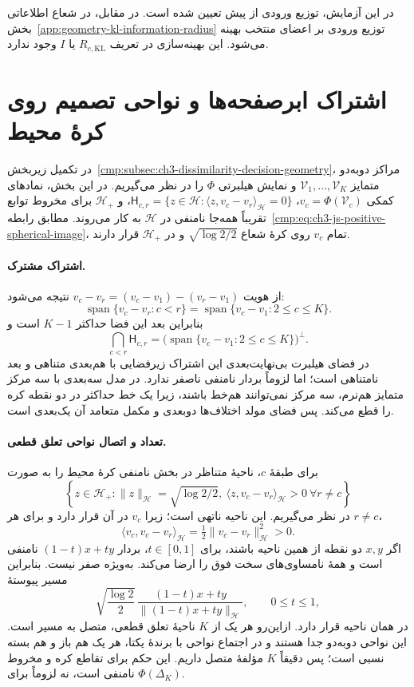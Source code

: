 در این آزمایش، توزیع ورودی از پیش تعیین شده
است. در مقابل، در شعاع اطلاعاتی
بخش~\ref{app:geometry-kl-information-radius}
توزیع ورودی بر اعضای منتخب بهینه می‌شود.
این بهینه‌سازی در تعریف $R_{c,\mathrm{KL}}$
یا $I$ وجود ندارد.

\section{اشتراک ابرصفحه‌ها و نواحی تصمیم روی کرهٔ محیط}
\label{app:geometry-js-spherical-decision}
در تکمیل زیربخش~\ref{cmp:subsec:ch3-dissimilarity-decision-geometry}،
مراکز دوبه‌دو متمایز $\mathcal V_1,\ldots,\mathcal V_K$
و نمایش هیلبرتی $\Phi$ را در نظر می‌گیریم.
در این بخش، نمادهای کمکی $v_c=\Phi(\mathcal V_c)$،
$\mathsf H_{c,r}=\{z\in\mathcal H:
\langle z,v_c-v_r\rangle_{\mathcal H}=0\}$،
و $\mathcal H_+$ برای مخروط توابع تقریباً همه‌جا
نامنفی در $\mathcal H$ به کار می‌روند. مطابق
رابطه~\eqref{cmp:eq:ch3-js-positive-spherical-image}،
تمام $v_c$ روی کرهٔ شعاع $\sqrt{\log2/2}$ و در
$\mathcal H_+$ قرار دارند.

\paragraph{اشتراک مشترک.}
از هویت $v_c-v_r=(v_c-v_1)-(v_r-v_1)$
نتیجه می‌شود:
\[
\operatorname{span}\{v_c-v_r:c<r\}
=\operatorname{span}\{v_c-v_1:2\le c\le K\}.
\]
بنابراین بعد این فضا حداکثر $K-1$ است و
\begin{equation}\label{eq:app-ch3-js-hyperplane-intersection}
\bigcap_{c<r}\mathsf H_{c,r}
=\bigl(\operatorname{span}\{v_c-v_1:2\le c\le K\}\bigr)^\perp.
\end{equation}
در فضای هیلبرت بی‌نهایت‌بعدی این اشتراک
زیرفضایی با هم‌بعدی متناهی و بعد نامتناهی
است؛ اما لزوماً بردار نامنفی ناصفر ندارد.
در مدل سه‌بعدی با سه مرکز متمایز هم‌نرم،
سه مرکز نمی‌توانند هم‌خط باشند، زیرا یک خط
حداکثر در دو نقطه کره را قطع می‌کند. پس فضای
مولد اختلاف‌ها دوبعدی و مکمل متعامد آن
یک‌بعدی است.

\paragraph{تعداد و اتصال نواحی تعلق قطعی.}
برای طبقهٔ $c$، ناحیهٔ متناظر در بخش نامنفی
کرهٔ محیط را به صورت
\[
\left\{z\in\mathcal H_+:
\|z\|_{\mathcal H}=\sqrt{\log2/2},\
\langle z,v_c-v_r\rangle_{\mathcal H}>0
\ \forall r\ne c\right\}
\]
در نظر می‌گیریم. این ناحیه ناتهی است؛ زیرا
$v_c$ در آن قرار دارد و برای هر $r\ne c$،
\[
\langle v_c,v_c-v_r\rangle_{\mathcal H}
=\tfrac12\|v_c-v_r\|_{\mathcal H}^2>0.
\]
اگر $x,y$ دو نقطه از همین ناحیه باشند، برای
$t\in[0,1]$، بردار $(1-t)x+ty$ نامنفی است و
همهٔ نامساوی‌های سخت فوق را ارضا می‌کند.
به‌ویژه صفر نیست. بنابراین مسیر پیوستهٔ
\[
\sqrt{\frac{\log2}{2}}\,
\frac{(1-t)x+ty}{\|(1-t)x+ty\|_{\mathcal H}},
\qquad 0\le t\le1,
\]
در همان ناحیه قرار دارد. ازاین‌رو هر یک از
$K$ ناحیهٔ تعلق قطعی، متصل به مسیر است.
این نواحی دو‌به‌دو جدا هستند و در اجتماع
نواحی با برندهٔ یکتا، هر یک هم باز و هم بسته
نسبی است؛ پس دقیقاً $K$ مؤلفهٔ متصل داریم.
این حکم برای تقاطع کره و مخروط نامنفی است،
نه لزوماً برای $\Phi(\Delta_K)$.


